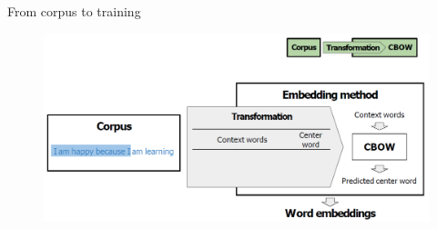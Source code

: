 \begin{frame}[allowframebreaks]{From corpus to training}
    \begin{figure}
        \centering
        \includegraphics[width=\textwidth,height=0.8\textheight,keepaspectratio]{images/vector-space/corpus2training.png}
    \end{figure}
\end{frame}

